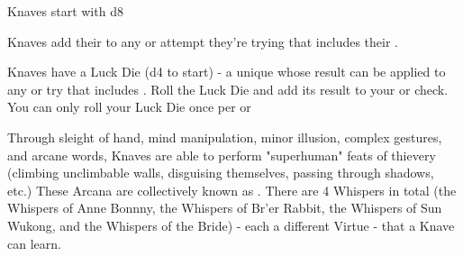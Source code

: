



  Knaves start with d8 \FLESH 


  Knaves add their \LVL to any \RO or \RB attempt they're trying that includes their \DEX.  


  Knaves have a Luck Die (d4 to start) - a unique \UD whose result can be applied to any \RO or \RB try that includes \DEX.  Roll the Luck Die and add its result to your \RO or \RB check.  You can only roll your Luck Die once per \RO or \RB


  Through sleight of hand, mind manipulation, minor illusion, complex gestures, and arcane words, Knaves are able to perform "superhuman" feats of thievery (climbing unclimbable walls, disguising themselves, passing through shadows, etc.)  These Arcana are collectively known as .  There are 4 Whispers in total (the Whispers of Anne Bonnny, the Whispers of Br'er Rabbit, the Whispers of Sun Wukong, and the Whispers of the Bride) - each a different Virtue - that a Knave can learn.

\cbreak





